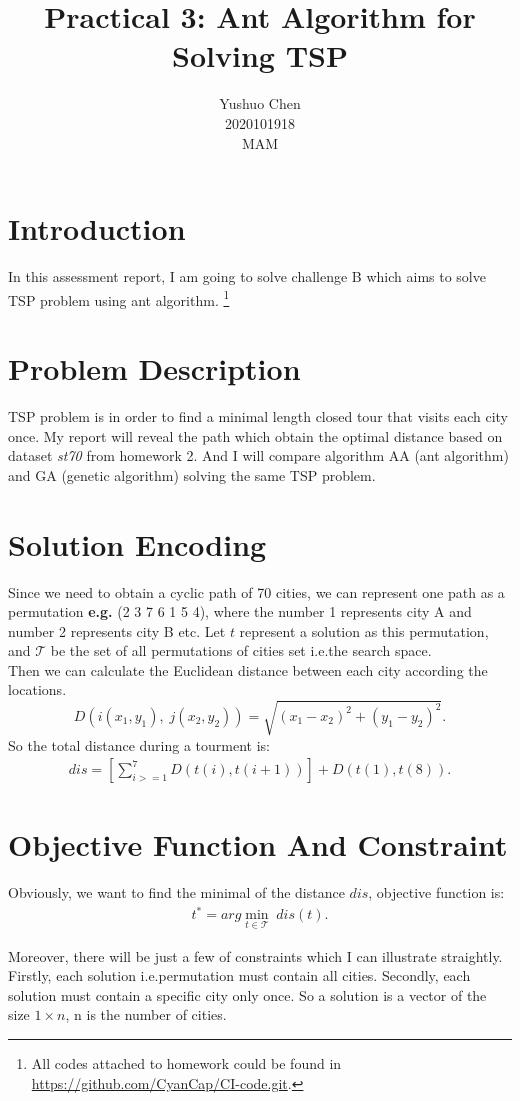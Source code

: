 \documentclass{article}
\begin{document}
\title{\textbf{Practical 3: Ant Algorithm for Solving TSP}}
\author{Yushuo Chen\\2020101918\\MAM}
\maketitle

\section*{Introduction}
In this assessment report, I am going to solve challenge B which aims to solve TSP problem using ant algorithm.
\footnote{All codes attached to homework could be found in \url{https://github.com/CyanCap/CI-code.git}.}

\section{Problem Description}
TSP problem is in order to find a minimal length closed tour that visits each city once.
My report will reveal the path which obtain the optimal distance based on dataset \textit{st70} from homework 2.
And I will compare algorithm AA (ant algorithm) and GA (genetic algorithm) solving the same TSP problem.

\section{Solution Encoding}
Since we need to obtain a cyclic path of 70 cities, we can represent one path as a permutation \textbf{e.g.} (2 3 7 6 1 5 4),
where the number 1 represents city A and number 2 represents city B etc.
Let $t$ represent a solution as this permutation, and $\mathcal{T}$ be the set of all permutations of cities set i.e.the search space.\\

Then we can calculate the Euclidean distance between each city according the locations.
\[
    D(i(x_1,y_1),\; j(x_2,y_2))=\sqrt{(x_1 - x_2)^2 + (y_1 - y_2)^2}.
\]
So the total distance during a tourment is:
\begin{align*}
    dis=[\sum_{i>=1}^{7} D(t(i),t(i+1))]+D(t(1),t(8)).
\end{align*}

\section{Objective Function And Constraint}
Obviously, we want to find the minimal of the distance $dis$, objective function is:
\begin{align*}
    t^* = arg\min_{t\in \mathcal{T}} \;dis(t).
\end{align*}
\par Moreover, there will be just a few of constraints which I can illustrate straightly.
Firstly, each solution i.e.permutation must contain all cities.
Secondly, each solution must contain a specific city only once.
So a solution is a vector of the size $1 \times n$, n is the number of cities.
\end{document}
